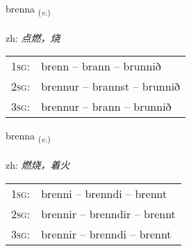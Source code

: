 \documentclass[frontgrid, backgrid]{flacards}\usepackage[]{graphicx}\usepackage[]{color}
\begin{document}
\renewcommand{\flhead}{\vskip5pt \fboxsep=0pt {\small\bfseries\footnotesize Sagnorð | 动词}}
\renewcommand{\fcfoot}{\vskip5pt \fboxsep=0pt \hspace{2pt}{\small\bfseries\footnotesize 2K}}

\renewcommand{\blhead}{\vskip5pt {\small\bfseries\footnotesize Sagnorð | 动词 }}
\renewcommand{\bcfoot}{\vskip5pt \hspace{2pt}{\small\bfseries\footnotesize 2K}}


{brenna \small{\textsubscript{(\textit{v.})}} \\[1ex] %
\textphonetic{[prɛna]} \\
zh: \emph{点燃，烧} \\  [2ex]
\renewcommand*{\arraystretch}{0.8}
\begin{tabular}{p{1cm}l}
\textsc{1sg}: & brenn -- brann -- brunnið \\ 
\textsc{2sg}: & brennur -- brannst -- brunnið \\ 
\textsc{3sg}: & brennur -- brann -- brunnið \\ 
\end{tabular}
}

\renewcommand{\flhead}{\vskip5pt \fboxsep=0pt {\small\bfseries\footnotesize Sagnorð | 动词}}
\renewcommand{\fcfoot}{\vskip5pt \fboxsep=0pt \hspace{2pt}{\small\bfseries\footnotesize 2K}}

\renewcommand{\blhead}{\vskip5pt {\small\bfseries\footnotesize Sagnorð | 动词 }}
\renewcommand{\bcfoot}{\vskip5pt \hspace{2pt}{\small\bfseries\footnotesize 2K}}


{brenna \small{\textsubscript{(\textit{v.})}} \\[1ex] %
\textphonetic{[prɛna]} \\
zh: \emph{燃烧，着火} \\  [2ex]
\renewcommand*{\arraystretch}{0.8}
\begin{tabular}{p{1cm}l}
\textsc{1sg}: & brenni -- brenndi -- brennt \\ 
\textsc{2sg}: & brennir -- brenndir -- brennt \\ 
\textsc{3sg}: & brennir -- brenndi -- brennt \\ 
\end{tabular}
}
\end{document}
